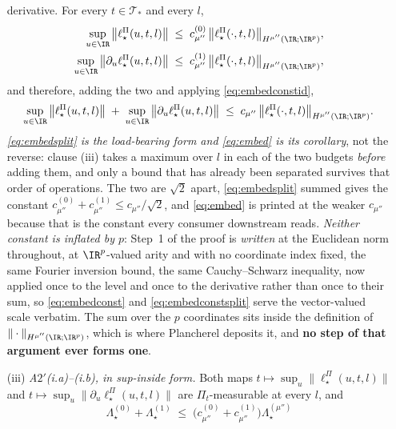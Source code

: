 \begin{lemma}
\begin{enumerate}
derivative. For every $t\in\mathcal T_\ast$ and every $l$,
\begin{equation}\label{eq:embedsplit}
\begin{split}
\sup_{u\in\IR}\big\|\ell^\Pi_\star(u,t,l)\big\|\;&\le\;c^{(0)}_{\mu''}\,\big\|\ell^\Pi_\star(\cdot,t,l)\big\|_{H^{\mu''}(\IR;\IR^{p})},\\
\sup_{u\in\IR}\big\|\partial_u\ell^\Pi_\star(u,t,l)\big\|\;&\le\;c^{(1)}_{\mu''}\,\big\|\ell^\Pi_\star(\cdot,t,l)\big\|_{H^{\mu''}(\IR;\IR^{p})} ,
\end{split}
\end{equation}
and therefore, adding the two and applying \eqref{eq:embedconstid},
\begin{equation}\label{eq:embed}
\sup_{u\in\IR}\big\|\ell^\Pi_\star(u,t,l)\big\|\;+\;\sup_{u\in\IR}\big\|\partial_u\ell^\Pi_\star(u,t,l)\big\|
\;\le\;c_{\mu''}\,\big\|\ell^\Pi_\star(\cdot,t,l)\big\|_{H^{\mu''}(\IR;\IR^{p})} .
\end{equation}
\emph{\eqref{eq:embedsplit} is the load-bearing form and \eqref{eq:embed} is its corollary}, not the
reverse: clause \textup{(iii)} takes a maximum over $l$ in each of the two budgets \emph{before} adding
them, and only a bound that has already been separated survives that order of operations. The two are
$\sqrt2$ apart, \eqref{eq:embedsplit} summed gives the constant
$c^{(0)}_{\mu''}+c^{(1)}_{\mu''}\le c_{\mu''}/\sqrt2$, and \eqref{eq:embed} is printed at the weaker
$c_{\mu''}$ because that is the constant every consumer downstream reads.
\emph{Neither constant is inflated by $p$}: Step~1 of the proof is \emph{written} at the Euclidean norm
throughout, at $\IR^{p}$-valued arity and with no coordinate index fixed, the same Fourier
inversion bound, the same Cauchy--Schwarz inequality, now applied once to the level and once to the
derivative rather than once to their sum, so \eqref{eq:embedconst} and \eqref{eq:embedconstsplit}
serve the vector-valued scale verbatim. The sum over the $p$ coordinates sits inside the
definition of $\|\cdot\|_{H^{\mu''}(\IR;\IR^{p})}$, which is where Plancherel deposits it, and
\textbf{no step of that argument ever forms one}.
\item[(iii)] \emph{A$2'$(i.a)--(i.b), in sup-inside form.} Both maps
$t\mapsto\sup_u\|\ell^\Pi_\star(u,t,l)\|$ and $t\mapsto\sup_u\|\partial_u\ell^\Pi_\star(u,t,l)\|$ are
$\Pi_t$-measurable at every $l$, and
\begin{equation}\label{eq:l21budget}
\Lambda^{(0)}_\star+\Lambda^{(1)}_\star
\;\le\;\big(c^{(0)}_{\mu''}+c^{(1)}_{\mu''}\big)\Lambda^{(\mu'')}_\star

\end{equation}
\end{enumerate}
\end{lemma}
